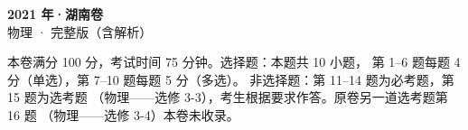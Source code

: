 \documentclass[zihao=-4, a4paper]{ctexart}
\begin{document}
\begin{center}
  {\Large\bfseries 2021 年·湖南卷}\\[4pt]
  {\large 物理 · 完整版（含解析）}
\end{center}
\medskip
\begin{gknotice}
  本卷满分 100 分，考试时间 75 分钟。选择题：本题共 10 小题，
  第 1--6 题每题 4 分（单选），第 7--10 题每题 5 分（多选）。
  非选择题：第 11--14 题为必考题，第 15 题为选考题
  （物理——选修 3-3），考生根据要求作答。原卷另一道选考题第 16 题
  （物理——选修 3-4）本卷未收录。
\end{gknotice}

\clearpage
{}

\clearpage
{}

\end{document}
